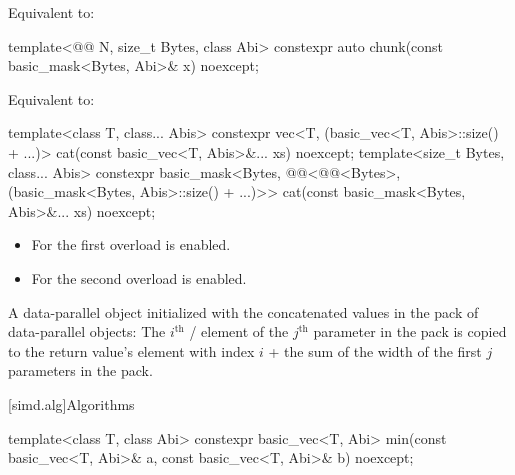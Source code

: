 \begin{itemdescr}
\pnum
\effects
Equivalent to: 
\end{itemdescr}

\begin{itemdecl}
template<@@ N, size_t Bytes, class Abi>
  constexpr auto chunk(const basic_mask<Bytes, Abi>& x) noexcept;
\end{itemdecl}

\begin{itemdescr}
\pnum
\effects
Equivalent to: 
\end{itemdescr}

\begin{itemdecl}
template<class T, class... Abis>
  constexpr vec<T, (basic_vec<T, Abis>::size() + ...)>
    cat(const basic_vec<T, Abis>&... xs) noexcept;
template<size_t Bytes, class... Abis>
  constexpr basic_mask<Bytes, @@<@@<Bytes>,
                            (basic_mask<Bytes, Abis>::size() + ...)>>
    cat(const basic_mask<Bytes, Abis>&... xs) noexcept;
\end{itemdecl}

\begin{itemdescr}
\pnum
\constraints
\begin{itemize}
 \item
   For the first overload 
   is enabled.
 \item
   For the second overload
    is enabled.
\end{itemize}

\pnum
\returns
A data-parallel object initialized with the concatenated values in the
 pack of data-parallel objects: The $i^\text{th}$
/ element of the $j^\text{th}$
parameter in the  pack is copied to the return value's element with
index $i$ + the sum of the width of the first $j$ parameters in the 
pack.
\end{itemdescr}

[simd.alg]{Algorithms}

\begin{itemdecl}
template<class T, class Abi>
  constexpr basic_vec<T, Abi> min(const basic_vec<T, Abi>& a,
                                  const basic_vec<T, Abi>& b) noexcept;
\end{itemdecl}

